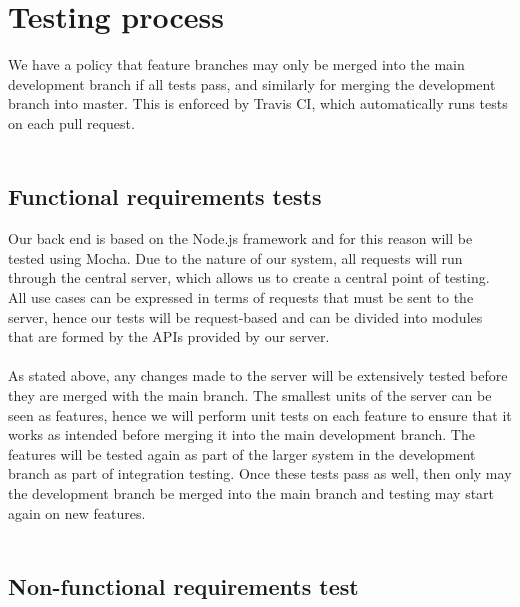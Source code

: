 \documentclass{article}
\begin{document}
\section{Testing process}
We have a policy that feature branches may only be merged into the main development branch if all tests pass, and similarly for merging the development branch into master. This is enforced by Travis CI, which automatically runs tests on each pull request.
\\ \\
\subsection*{Functional requirements tests}
Our back end is based on the Node.js framework and for this reason will be tested using Mocha. Due to the nature of our system, all requests will run through the central server, which allows us to create a central point of testing. All use cases can be expressed in terms of requests that must be sent to the server, hence our tests will be request-based and can be divided into modules that are formed by the APIs provided by our server.
\\ \\
As stated above, any changes made to the server will be extensively tested before they are merged with the main branch. The smallest units of the server can be seen as features, hence we will perform unit tests on each feature to ensure that it works as intended before merging it into the main development branch. The features will be tested again as part of the larger system in the development branch as part of integration testing. Once these tests pass as well, then only may the development branch be merged into the main branch and testing may start again on new features.
\\ \\
\subsection*{Non-functional requirements test}
\end{document}
